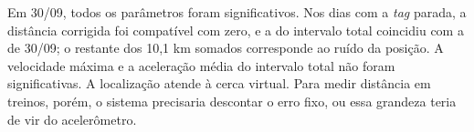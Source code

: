 Em 30/09, todos os parâmetros foram significativos. Nos dias com a \textit{tag} parada, a distância corrigida foi compatível com zero, e a do intervalo total coincidiu com a de 30/09; o restante dos 10,1 km somados corresponde ao ruído da posição. A velocidade máxima e a aceleração média do intervalo total não foram significativas. A localização atende à cerca virtual. Para medir distância em treinos, porém, o sistema precisaria descontar o erro fixo, ou essa grandeza teria de vir do acelerômetro.

